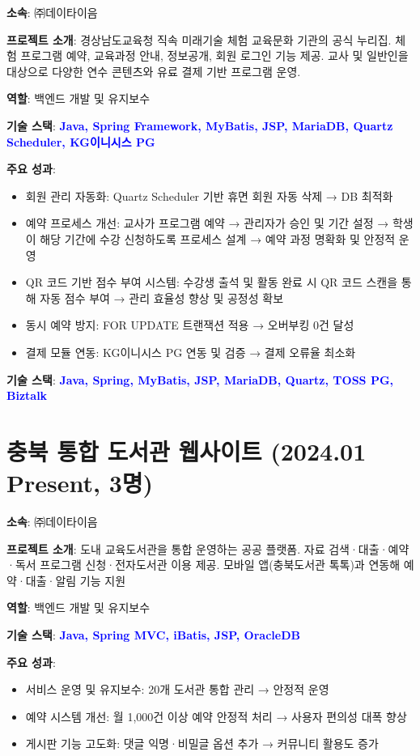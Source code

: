 \documentclass[a4paper,11pt]{article}
\newcommand{\tech}[1]{\textbf{\textcolor{blue}{#1}}}
\begin{document}
\textbf{소속}: ㈜데이타이음

\textbf{프로젝트 소개}:  
경상남도교육청 직속 미래기술 체험 교육문화 기관의 공식 누리집.  
체험 프로그램 예약, 교육과정 안내, 정보공개, 회원 로그인 기능 제공.  
교사 및 일반인을 대상으로 다양한 연수 콘텐츠와 유료 결제 기반 프로그램 운영.

\textbf{역할}: 백엔드 개발 및 유지보수

\textbf{기술 스택}: \tech{Java, Spring Framework, MyBatis, JSP, MariaDB, Quartz Scheduler, KG이니시스 PG}

\textbf{주요 성과}:
\begin{itemize}[leftmargin=*]
  \item 회원 관리 자동화: Quartz Scheduler 기반 휴면 회원 자동 삭제 → DB 최적화
  \item 예약 프로세스 개선: 교사가 프로그램 예약 → 관리자가 승인 및 기간 설정 → 학생이 해당 기간에 수강 신청하도록 프로세스 설계 → 예약 과정 명확화 및 안정적 운영
  \item QR 코드 기반 점수 부여 시스템: 수강생 출석 및 활동 완료 시 QR 코드 스캔을 통해 자동 점수 부여 → 관리 효율성 향상 및 공정성 확보
  \item 동시 예약 방지: FOR UPDATE 트랜잭션 적용 → 오버부킹 0건 달성
  \item 결제 모듈 연동: KG이니시스 PG 연동 및 검증 → 결제 오류율 최소화
\end{itemize}

\textbf{기술 스택}: \tech{Java, Spring, MyBatis, JSP, MariaDB, Quartz, TOSS PG, Biztalk}

\section{충북 통합 도서관 웹사이트 (2024.01 ~ Present, 3명)}

\textbf{소속}: ㈜데이타이음

\textbf{프로젝트 소개}:  
도내 교육도서관을 통합 운영하는 공공 플랫폼.  
자료 검색·대출·예약·독서 프로그램 신청·전자도서관 이용 제공.  
모바일 앱(충북도서관 톡톡)과 연동해 예약·대출·알림 기능 지원

\textbf{역할}: 백엔드 개발 및 유지보수

\textbf{기술 스택}: \tech{Java, Spring MVC, iBatis, JSP, OracleDB}

\textbf{주요 성과}:
\begin{itemize}[leftmargin=*]
  \item 서비스 운영 및 유지보수: 20개 도서관 통합 관리 → 안정적 운영
  \item 예약 시스템 개선: 월 1,000건 이상 예약 안정적 처리 → 사용자 편의성 대폭 향상
  \item 게시판 기능 고도화: 댓글 익명·비밀글 옵션 추가 → 커뮤니티 활용도 증가
\end{itemize}
\end{document}
